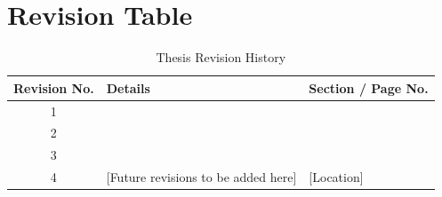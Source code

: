 
\chapter*{Revision Table}

\begin{table}[h]
\centering
\begin{tabular}{|c|p{8cm}|p{4cm}|}
\hline
\textbf{Revision No.} & \textbf{Details} & \textbf{Section / Page No.} \\
\hline
1 & &  \\
\hline
2 &  &  \\
\hline
3 &  &  \\
\hline
4 & [Future revisions to be added here] & [Location] \\
\hline
\end{tabular}
{\color{maroon}\tiny\caption[Thesis Revision History]{Thesis Revision History}}
\end{table}

\clearpage
